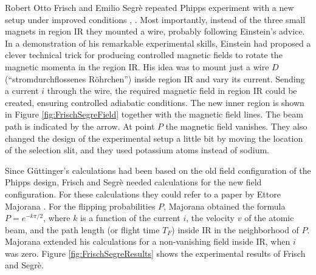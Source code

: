\documentclass[12pt]{article}
\begin{document}
Robert Otto Frisch and Emilio Segrè repeated Phipps experiment with a new setup under improved conditions \citep{FrischOEtal1933Einstellung}, \cite[pp.~68--71]{SegreE1993Mind}.  Most importantly, instead of the three small magnets in region IR they mounted a wire, probably following Einstein's advice. In a demonstration of his remarkable experimental skills, Einstein had proposed a clever technical trick for producing controlled magnetic fields to rotate the magnetic momenta in the region IR.  His idea was to mount just a wire $D$ (``stromdurchflossenes Röhrchen'') inside region IR and vary its current. Sending a current $i$ through the wire, the required magnetic field in region IR could be created, ensuring controlled adiabatic conditions. The new inner region is shown in Figure \ref{fig:FrischSegreField} together with the magnetic field lines. The beam path is indicated by the arrow. 
At point $P$ the magnetic field vanishes. They also changed the design of the experimental setup a little bit by moving the location of the selection slit, and they used potassium atoms instead of sodium.

Since Güttinger's calculations had been based on the old field configuration of the Phipps design, Frisch and Segrè needed calculations for the new field configuration. For these calculations they could refer to a paper by Ettore Majorana \citep{MajoranaE1932Atomi,InguscioM2006Comment}. For the flipping probabilities $P$, Majorana obtained the formula $P=e^{-k\pi/2}$, where $k$ is a function of the current $i$, the velocity $v$ of the atomic beam, and the path length (or flight time $T_F$) inside IR in the neighborhood of $P$. Majorana extended his calculations for a non-vanishing field inside IR, when $i$ was zero. Figure \ref{fig:FrischSegreResults} shows the experimental results of Frisch and Segrè. 
\end{document}
